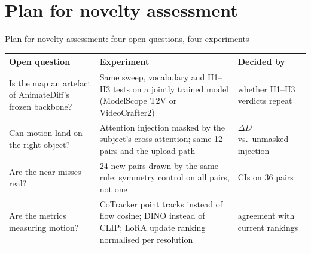\documentclass[aspectratio=169,11pt]{beamer}
\newcommand{\dD}{\Delta D}
\begin{document}
\section{Plan for novelty assessment}
\begin{frame}{Plan for novelty assessment: four open questions, four experiments}
  \small
  \begin{tabularx}{\textwidth}{@{}p{4.3cm}Xp{3.3cm}@{}}
    \toprule
    Open question & Experiment & Decided by \\
    \midrule
    Is the map an artefact of AnimateDiff's frozen backbone? &
      Same sweep, vocabulary and H1--H3 tests on a jointly trained model (ModelScope T2V or VideoCrafter2) &
      whether H1--H3 verdicts repeat \\[1mm]
    Can motion land on the right object? &
      Attention injection masked by the subject's cross-attention; same 12 pairs and the upload path &
      $\dD$ vs.\ unmasked injection \\[1mm]
    Are the near-misses real? &
      24 new pairs drawn by the same rule; symmetry control on all pairs, not one &
      CIs on 36 pairs \\[1mm]
    Are the metrics measuring motion? &
      CoTracker \cite{karaev2024cotracker} point tracks instead of flow cosine; DINO instead of CLIP;
      LoRA update ranking normalised per resolution &
      agreement with current rankings \\
    \bottomrule
  \end{tabularx}
\end{frame}

\end{document}
